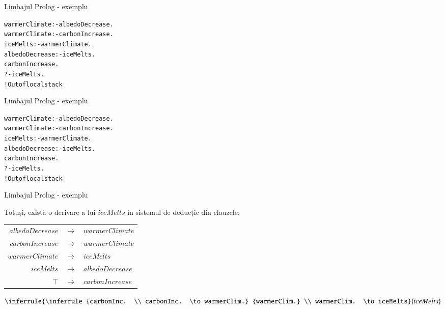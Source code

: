 \documentclass[xcolor=pdftex,romanian,colorlinks]{beamer}
\begin{document}
\begin{frame}{Limbajul Prolog - exemplu}

\begin{alltt}
warmerClimate :- albedoDecrease. \\
warmerClimate :- carbonIncrease. \\
iceMelts :- warmerClimate. \\
albedoDecrease :- iceMelts. \\
carbonIncrease. \\

?- iceMelts.\\
\alert{! Out of local stack}
\end{alltt}

\end{frame}


\begin{frame}{Limbajul Prolog - exemplu}

\begin{alltt}
\alert{warmerClimate} :- \alert{albedoDecrease.} \\
warmerClimate :- carbonIncrease. \\
\alert{iceMelts} :- \alert{warmerClimate}. \\
\alert{albedoDecrease} :- \alert{iceMelts.} \\
carbonIncrease. \\

?- iceMelts.\\
\alert{! Out of local stack}
\end{alltt}

\end{frame}

\begin{frame}{Limbajul Prolog - exemplu}

Totuși, există o derivare a lui $iceMelts$ în sistemul de deducție din clauzele:
\begin{center}
\begin{tabular}{rcl}

$albedoDecrease$ & $\to$ & $warmerClimate  $ \\
$carbonIncrease$ & $\to$ & $warmerClimate $ \\
$warmerClimate$ & $\to$ & $iceMelts$  \\
$iceMelts$ & $\to$ & $albedoDecrease$ \\
$\top$&$\to$ & $carbonIncrease $ \\

\end{tabular}

\bigskip
$
\inferrule
	{\inferrule
	{carbonInc. \\ carbonInc. \to warmerClim.}
	{warmerClim.} \\ warmerClim. \to iceMelts}
	{iceMelts}
$
\end{center}

\end{frame}
\end{document}

